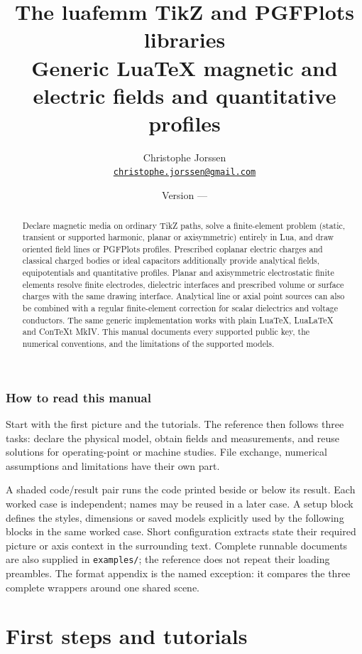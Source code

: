 \documentclass[a4paper,11pt]{ltxdoc}
\title{The \textsf{luafemm} TikZ and PGFPlots libraries\\
  \large Generic LuaTeX magnetic and electric fields and quantitative profiles}
\author{Christophe Jorssen\\
  \normalsize\href{mailto:christophe.jorssen@gmail.com}{\nolinkurl{christophe.jorssen@gmail.com}}}
\date{Version \luafemmversion\quad---\quad\luafemmversiondate}
\begin{document}
\maketitle
\begin{abstract}
Declare magnetic media on ordinary TikZ paths, solve a finite-element
problem (static, transient or supported harmonic, planar or axisymmetric) entirely in Lua, and draw oriented field lines or PGFPlots profiles.
Prescribed coplanar electric charges and classical charged bodies or ideal
capacitors additionally provide analytical fields, equipotentials and quantitative profiles.
Planar and axisymmetric electrostatic finite elements resolve finite electrodes, dielectric interfaces
and prescribed volume or surface charges with the same drawing interface.
Analytical line or axial point sources can also be combined with a regular
finite-element correction for scalar dielectrics and voltage conductors.
The same generic implementation works with plain LuaTeX, LuaLaTeX and
ConTeXt MkIV. This manual documents every supported public key, the numerical
conventions, and the limitations of the supported models.
\end{abstract}
\section*{How to read this manual}
Start with the first picture and the tutorials. The reference then follows
three tasks: declare the physical model, obtain fields and measurements, and
reuse solutions for operating-point or machine studies. File exchange,
numerical assumptions and limitations have their own part.

A shaded code/result pair runs the code printed beside or below its result.
Each worked case is independent; names may be reused in a later case.
A setup block defines the styles, dimensions or saved models explicitly used
by the following blocks in the same worked case. Short configuration extracts
state their required picture or axis context in the surrounding text. Complete
runnable documents are also supplied in \texttt{examples/}; the reference does
not repeat their loading preambles. The format appendix is the named exception:
it compares the three complete wrappers around one shared scene.


\clearpage
\tableofcontents
\clearpage
\part{First steps and tutorials}









\end{document}
